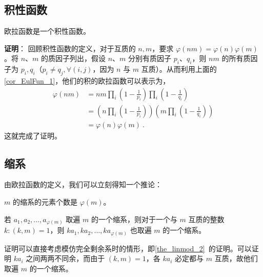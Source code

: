 \subsection{积性函数}
\begin{theorem}{}\label{the_EulFun_2}
欧拉函数是一个积性函数。
\end{theorem}
\textbf{证明}：
回顾积性函数的定义，对于互质的 $n, m$，要求 $\varphi(n m ) = \varphi(n) \varphi(m)$。将 $n$、$m$ 的质因子列出，假设 $n$、$m$ 分别有质因子 $p_i$、$q_i$，则 $nm$ 的所有质因子为 $p_i, q_i$（$p_i \neq q_j, \forall (i, j)$，因为 $n$ 与 $m$ 互质）。从而利用上面的\autoref{cor_EulFun_1}，他们的积的欧拉函数可以表示为，
\begin{equation}
\begin{aligned}
\varphi(n m) &= nm \prod_i \left(1-\frac1{p_i}\right) \prod_i \left(1-\frac1{q_i}\right)\\
&= \left(n \prod_i \left(1 - \frac1{p_i}\right)\right) \left(m \prod_i \left(1 - \frac1{q_i}\right)\right)\\
&= \varphi(n) \varphi(m) ~.
\end{aligned}
\end{equation}
这就完成了证明。



\subsection{缩系}
由欧拉函数的定义，我们可以立刻得知一个推论：
\begin{corollary}{}
$m$ 的缩系的元素个数是 $\varphi(m)$。
\end{corollary}

\begin{theorem}{}\label{the_EulFun_1}
若 $a_1, a_2, \dots, a_{\varphi(m)}$ 取遍 $m$ 的一个缩系，则对于一个与 $m$ 互质的整数 $k: (k, m) = 1$，则
 $k a_1, k a_2, \dots, k a_{\varphi(m)}$ 也取遍 $m$ 的一个缩系。
\end{theorem}
证明可以直接考虑模仿完全剩余系时的情形，即\autoref{the_linmod_2}~的证明。可以证明 $k a_i$ 之间两两不同余，而由于 $(k, m) = 1$，各 $k a_i$ 必定都与 $m$ 互质，故他们取遍 $m$ 的一个缩系。
